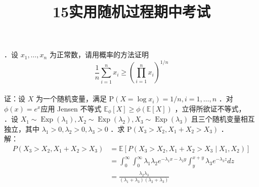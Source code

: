 \documentclass[UTF8]{ctexart}
\title{15实用随机过程期中考试}
\author{\calligra{NULIOUS}}
\date{}
\begin{document}
\maketitle
{}．设 $x_{1}, \ldots, x_{n}$ 为正常数，请用概率的方法证明
$$
\frac{1}{n} \sum_{i=1}^{n} x_{i} \geq\left(\prod_{i=1}^{n} x_{i}\right)^{1 / n}
$$\\
证：设 $X$ 为一个随机变量，满足 $\mathrm{P}\left(X=\log x_{i}\right)=1 / n, i=1, \ldots, n$ ．对 $\phi(x)=e^x$应用 Jensen 不等式 $\mathbb{E}_{\phi}[X] \geq \phi(\mathbb{E} [X])$ ，立得所欲证不等式，\\



．设 $X_{1} \sim \operatorname{Exp}\left(\lambda_{1}\right), X_{2} \sim \operatorname{Exp}\left(\lambda_{2}\right), X_{3} \sim \operatorname{Exp}\left(\lambda_{3}\right)$ 且三个随机变量相互独立，其中 $\lambda_{1}>0, \lambda_{2}>0, \lambda_{3}>0$ ．求 $\mathrm{P}\left(X_{3}>X_{2}, X_{1}+X_{2}>X_{3}\right)$ ．\\
解：
$$
\begin{aligned}
	P\left(X_{3}>X_{2}, X_{1}+X_{2}>X_{3}\right) & =\mathbb{E}\left[P\left(X_{3}>X_{2}, X_{1}+X_{2}>X_{3} \mid X_{1}, X_{2}\right)\right] \\
	& =\int_{0}^{\infty} \int_{0}^{\infty} \lambda_{1} \lambda_{2} e^{-\lambda_{1} x-\lambda_{2} y} \int_{y}^{x+y} \lambda_{3} e^{-\lambda_{3} z} d z \\
	& =\frac{\lambda_{2} \lambda_{3}}{\left(\lambda_{1}+\lambda_{3}\right)\left(\lambda_{2}+\lambda_{3}\right)}
\end{aligned}
$$\\
\end{document}
